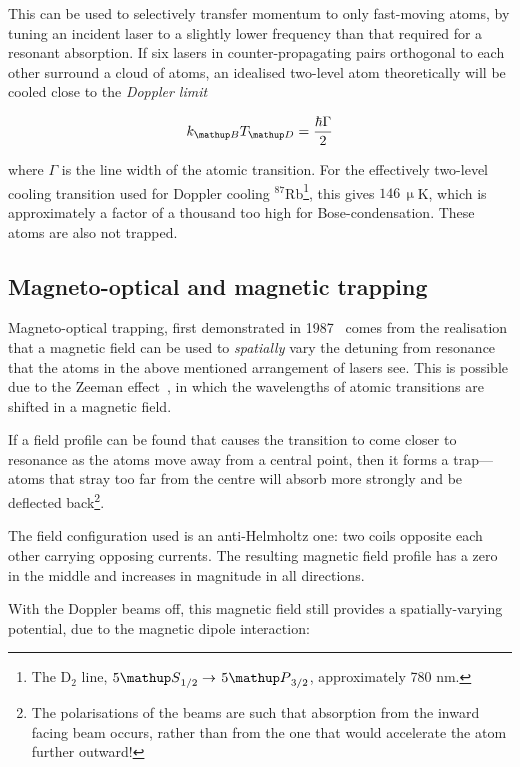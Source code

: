 This can be used to selectively transfer momentum to only fast-moving atoms, by tuning an incident laser to a slightly lower frequency than that required for a resonant absorption. If six lasers in counter-propagating pairs orthogonal to each other surround a cloud of atoms, an idealised two-level atom theoretically will be cooled close to the \emph{Doppler limit}~\cite[p 58]{metcalf_laser_1999}

\begin{equation}
k_\up{B} T_\up{D} = \frac{\hbar\Gamma}2
\end{equation}

where $\Gamma$ is the line width of the atomic transition. For the effectively two-level cooling transition used for Doppler cooling $^{87}$Rb\footnote{The D$_2$ line, $5\up{S}_{1/2}\rightarrow$ $5\up{P}_{3/2}$, approximately 780 nm.}, this gives $146\,\upmu$K, which is approximately a factor of a thousand too high for Bose-condensation. These atoms are also not trapped.

\subsection{Magneto-optical and magnetic trapping}

Magneto-optical trapping, first demonstrated in 1987~\cite{raab_trapping_1987} comes from the realisation that a magnetic field can be used to \emph{spatially} vary the detuning from resonance that the atoms in the above mentioned arrangement of lasers see. This is possible due to the Zeeman effect~\cite{zeeman_influence_1897}, in which the wavelengths of atomic transitions are shifted in a magnetic field.

If a field profile can be found that causes the transition to come closer to resonance as the atoms move away from a central point, then it forms a trap---atoms  that stray too far from the centre will absorb more strongly and be deflected back\footnote{The polarisations of the beams are such that absorption from the inward facing beam occurs, rather than from the one that would accelerate the atom further outward!}.

The field configuration used is an anti-Helmholtz one: two coils opposite each other carrying opposing currents. The resulting magnetic field profile has a zero in the middle and increases in magnitude in all directions.

With the Doppler beams off, this magnetic field still provides a spatially-varying potential, due to the magnetic dipole interaction:

